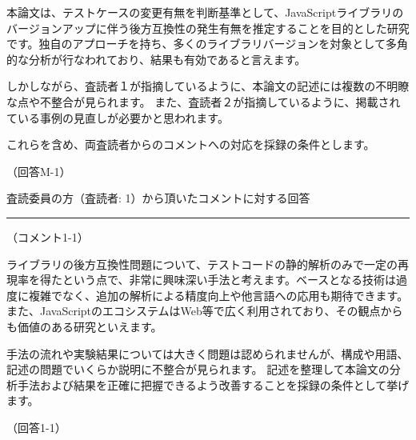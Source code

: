 \documentclass{jarticle} %
\def\section#1{ \vspace{3pc} {\large \gt #1} \vspace{1pc} \hrule }
\def\subsection#1{ \vspace{1pc} {\gt #1} }
\begin{document}
本論文は、テストケースの変更有無を判断基準として、JavaScriptライブラリのバージョンアップに伴う後方互換性の発生有無を推定することを目的とした研究です。独自のアプローチを持ち、多くのライブラリバージョンを対象として多角的な分析が行なわれており、結果も有効であると言えます。

しかしながら、査読者１が指摘しているように、本論文の記述には複数の不明瞭な点や不整合が見られます。
また、査読者２が指摘しているように、掲載されている事例の見直しが必要かと思われます。

これらを含め、両査読者からのコメントへの対応を採録の条件とします。


\subsection{（回答M-1）}


\newpage
\section{査読委員の方（査読者: 1）から頂いたコメントに対する回答}
\subsection{（コメント1-1）}

ライブラリの後方互換性問題について、テストコードの静的解析のみで一定の再現率を得たという点で、非常に興味深い手法と考えます。ベースとなる技術は過度に複雑でなく、追加の解析による精度向上や他言語への応用も期待できます。
また、JavaScriptのエコシステムはWeb等で広く利用されており、その観点からも価値のある研究といえます。

手法の流れや実験結果については大きく問題は認められませんが、構成や用語、記述の問題でいくらか説明に不整合が見られます。
記述を整理して本論文の分析手法および結果を正確に把握できるよう改善することを採録の条件として挙げます。

\subsection{（回答1-1）}
\end{document}
